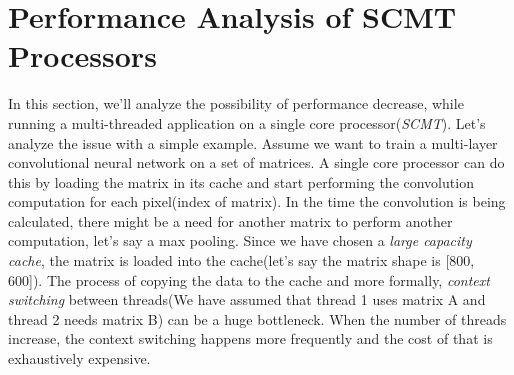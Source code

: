 \documentclass[12pt]{article}
\numberwithin{equation}{section}
\numberwithin{table}{section}
\numberwithin{figure}{section}
\begin{document}
\section{Performance Analysis of SCMT Processors}
In this section, we'll analyze the possibility of performance decrease, while running a multi-threaded application on a single core processor(\textit{SCMT}). Let's analyze the issue with a simple example. Assume we want to train a multi-layer convolutional neural network on a set of matrices. A single core processor can do this by loading the matrix in its cache and start performing the convolution computation for each pixel(index of matrix). In the time the convolution is being calculated, there might be a need for another matrix to perform another computation, let's say a max pooling. Since we have chosen a \textit{large capacity cache}, the matrix is loaded into the cache(let's say the matrix shape is [800, 600]). The process of copying the data to the cache and more formally, \textit{context switching} between threads(We have assumed that thread 1 uses matrix A and thread 2 needs matrix B) can be a huge bottleneck. When the number of threads increase, the context switching happens more frequently and the cost of that is exhaustively expensive.
\newpage
\end{document}
